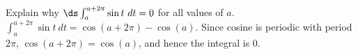 {Explain why $\ds \int_{a}^{a+2\pi} \sin t\ dt = 0$ for all values of $a$.
}
{$\int_{a}^{a+2\pi} \sin t\ dt = \cos(a+2\pi)-\cos(a)$. Since cosine is periodic with period $2\pi$, $\cos(a+2\pi) = \cos(a)$, and hence the integral is 0.
}

